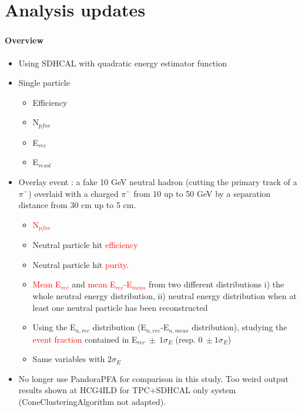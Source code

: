 \documentclass[8pt]{beamer}
\begin{document}
  

  
  
  \section{Analysis updates}

  \begin{frame}
  \frametitle{\secname}
  \framesubtitle{Overview}
    
    \begin{itemize}
      \item Using SDHCAL with quadratic energy estimator function
      \item Single particle
      \begin{itemize}
        \item Efficiency
        \item N$_{pfos}$
        \item E$_{rec}$
        \item E$_{resol}$
      \end{itemize}
      \item Overlay event : a fake 10 GeV neutral hadron (cutting the primary track of a $\pi^-$) overlaid with a charged $\pi^-$ from 10 up to 50 GeV by a separation distance from 30 cm up to 5 cm.
      \begin{itemize}
        \item \textcolor{red}{N$_{pfos}$}
        \item Neutral particle hit \textcolor{red}{efficiency}
        \item Neutral particle hit \textcolor{red}{purity}.
        \item \textcolor{red}{Mean E$_{rec}$} and \textcolor{red}{mean E$_{rec}$-E$_{meas}$} from two different distributions i) the whole neutral energy distribution, ii) neutral energy distribution when at least one neutral particle has been reconstructed
        \item Using the E$_{n,rec}$ distribution (E$_{n,rec}$-E$_{n,meas}$ distribution), studying the \textcolor{red}{event fraction} contained in E$_{rec}~\pm~1\sigma_{E}$ (resp. $0~\pm1\sigma_{E}$)
        \item Same variables with $2\sigma_{E}$
      \end{itemize}

      \item No longer use PandoraPFA for comparison in this study. Too weird output results shown at HCG4ILD for TPC+SDHCAL only system (ConeClusteringAlgorithm not adapted).
    \end{itemize}

    
    
  \end{frame}
\end{document}
